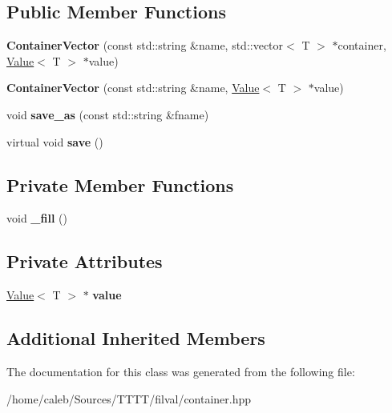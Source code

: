 \subsection*{Public Member Functions}
\begin{DoxyCompactItemize}
\item 
\hypertarget{classfv_1_1ContainerVector_a8bfcac1f432f1b61184f5adb1c411cfd}{}\label{classfv_1_1ContainerVector_a8bfcac1f432f1b61184f5adb1c411cfd} 
{\bfseries Container\+Vector} (const std\+::string \&name, std\+::vector$<$ T $>$ $\ast$container, \hyperlink{classfv_1_1Value}{Value}$<$ T $>$ $\ast$value)
\item 
\hypertarget{classfv_1_1ContainerVector_ac84c934248630971b883a1cf1609cd21}{}\label{classfv_1_1ContainerVector_ac84c934248630971b883a1cf1609cd21} 
{\bfseries Container\+Vector} (const std\+::string \&name, \hyperlink{classfv_1_1Value}{Value}$<$ T $>$ $\ast$value)
\item 
\hypertarget{classfv_1_1ContainerVector_abda11b97b7f06b3b2c61099b1e8a4410}{}\label{classfv_1_1ContainerVector_abda11b97b7f06b3b2c61099b1e8a4410} 
void {\bfseries save\+\_\+as} (const std\+::string \&fname)
\item 
\hypertarget{classfv_1_1ContainerVector_a25d5275136d098d96fe2a43266dbc2c6}{}\label{classfv_1_1ContainerVector_a25d5275136d098d96fe2a43266dbc2c6} 
virtual void {\bfseries save} ()
\end{DoxyCompactItemize}
\subsection*{Private Member Functions}
\begin{DoxyCompactItemize}
\item 
\hypertarget{classfv_1_1ContainerVector_a7d022ea13bcd5db0693b0b9e6172c1df}{}\label{classfv_1_1ContainerVector_a7d022ea13bcd5db0693b0b9e6172c1df} 
void {\bfseries \+\_\+fill} ()
\end{DoxyCompactItemize}
\subsection*{Private Attributes}
\begin{DoxyCompactItemize}
\item 
\hypertarget{classfv_1_1ContainerVector_a61f625e896ebdbe08949a5fad08dafab}{}\label{classfv_1_1ContainerVector_a61f625e896ebdbe08949a5fad08dafab} 
\hyperlink{classfv_1_1Value}{Value}$<$ T $>$ $\ast$ {\bfseries value}
\end{DoxyCompactItemize}
\subsection*{Additional Inherited Members}


The documentation for this class was generated from the following file\+:\begin{DoxyCompactItemize}
\item 
/home/caleb/\+Sources/\+T\+T\+T\+T/filval/container.\+hpp\end{DoxyCompactItemize}
